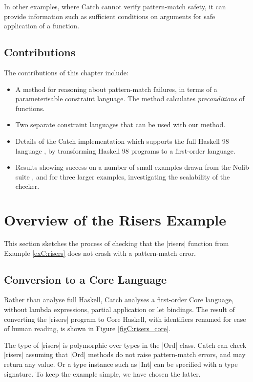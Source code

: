 In other examples, where Catch cannot verify pattern-match safety, it can provide information such as sufficient conditions on arguments for safe application of a function.

\subsection{Contributions}

The contributions of this chapter include:

\begin{itemize}
\item A method for reasoning about pattern-match failures, in terms of a parameterisable constraint language. The method calculates \textit{preconditions} of functions.
\item Two separate constraint languages that can be used with our method.
\item Details of the Catch implementation which supports the full Haskell 98 language \cite{haskell}, by transforming Haskell 98 programs to a first-order language.
\item Results showing success on a number of small examples drawn from the Nofib suite \cite{nofib}, and for three larger examples, investigating the scalability of the checker.
\end{itemize}


\section{Overview of the Risers Example}
\label{secC:walkthrough}

This section sketches the process of checking that the |risers| function from Example \ref{exC:risers} does not crash with a pattern-match error.


\subsection{Conversion to a Core Language}

Rather than analyse full Haskell, Catch analyses a first-order Core language, without lambda expressions, partial application or let bindings. The result of converting the |risers| program to Core Haskell, with identifiers renamed for ease of human reading, is shown in Figure \ref{figC:risers_core}.

The type of |risers| is polymorphic over types in the |Ord| class. Catch can check |risers| assuming that |Ord| methods do not raise pattern-match errors, and may return any value. Or a type instance such as |Int| can be specified with a type signature. To keep the example simple, we have chosen the latter.

